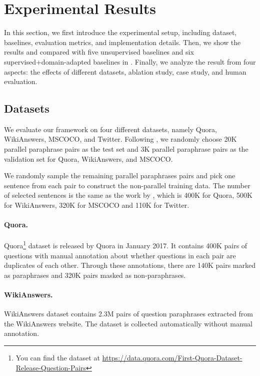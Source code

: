 \section{Experimental Results}

In this section, we first introduce the experimental setup, including dataset, baselines, evaluation metrics, and implementation details. Then, we show the results and compared with five unsupervised baselines and six supervised+domain-adapted baselines in . Finally, we analyze the result from four aspects: the effects of different datasets, ablation study, case study, 
and human evaluation.

\subsection{Datasets}
We evaluate our framework on four different datasets, namely Quora, WikiAnswers, MSCOCO, and Twitter. Following \citet{liu2019unsupervised}, we randomly choose 20K parallel paraphrase pairs as the test set and 3K parallel paraphrase pairs as the validation set for Quora, WikiAnswers, and MSCOCO. 

We randomly sample the remaining parallel paraphrases pairs and pick one sentence from each pair to construct the non-parallel training data.
The number of selected sentences is the same as the work by \citet{liu2019unsupervised}, which is 400K for Quora, 500K for WikiAnswers, 320K for MSCOCO and 110K for Twitter.

\paragraph{Quora. } Quora\footnote{You can find the dataset at \url{https://data.quora.com/First-Quora-Dataset-Release-Question-Pairs}} dataset is released by Quora in
January 2017. It contains 400K pairs of questions with manual annotation about whether questions in each pair are duplicates of each other. Through these annotations, there are 140K pairs marked as paraphrases and 320K pairs masked as non-paraphrases. 

\paragraph{WikiAnswers. } WikiAnswers \citep{fader2013paraphrase} dataset contains 2.3M pairs of question paraphrases extracted from the WikiAnswers website. The dataset is collected automatically without manual annotation.

